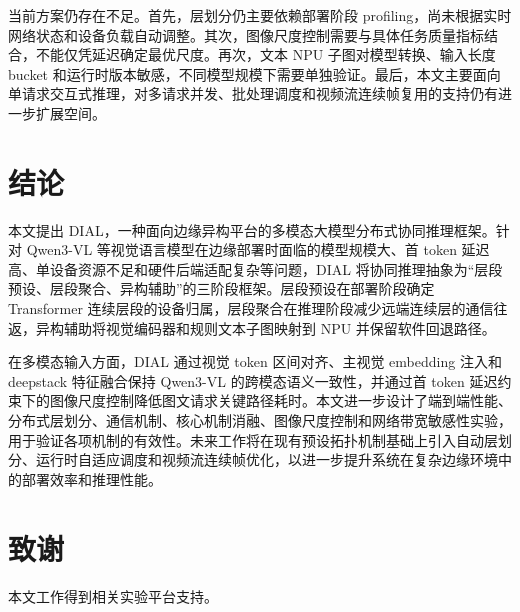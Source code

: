 \documentclass[10pt,a4paper,twocolumn]{ctexart}
\begin{document}
当前方案仍存在不足。首先，层划分仍主要依赖部署阶段 profiling，尚未根据实时网络状态和设备负载自动调整。其次，图像尺度控制需要与具体任务质量指标结合，不能仅凭延迟确定最优尺度。再次，文本 NPU 子图对模型转换、输入长度 bucket 和运行时版本敏感，不同模型规模下需要单独验证。最后，本文主要面向单请求交互式推理，对多请求并发、批处理调度和视频流连续帧复用的支持仍有进一步扩展空间。

\section{结论}

本文提出 DIAL，一种面向边缘异构平台的多模态大模型分布式协同推理框架。针对 Qwen3-VL 等视觉语言模型在边缘部署时面临的模型规模大、首 token 延迟高、单设备资源不足和硬件后端适配复杂等问题，DIAL 将协同推理抽象为“层段预设、层段聚合、异构辅助”的三阶段框架。层段预设在部署阶段确定 Transformer 连续层段的设备归属，层段聚合在推理阶段减少远端连续层的通信往返，异构辅助将视觉编码器和规则文本子图映射到 NPU 并保留软件回退路径。

在多模态输入方面，DIAL 通过视觉 token 区间对齐、主视觉 embedding 注入和 deepstack 特征融合保持 Qwen3-VL 的跨模态语义一致性，并通过首 token 延迟约束下的图像尺度控制降低图文请求关键路径耗时。本文进一步设计了端到端性能、分布式层划分、通信机制、核心机制消融、图像尺度控制和网络带宽敏感性实验，用于验证各项机制的有效性。未来工作将在现有预设拓扑机制基础上引入自动层划分、运行时自适应调度和视频流连续帧优化，以进一步提升系统在复杂边缘环境中的部署效率和推理性能。

\section*{致谢}

本文工作得到相关实验平台支持。
\end{document}
